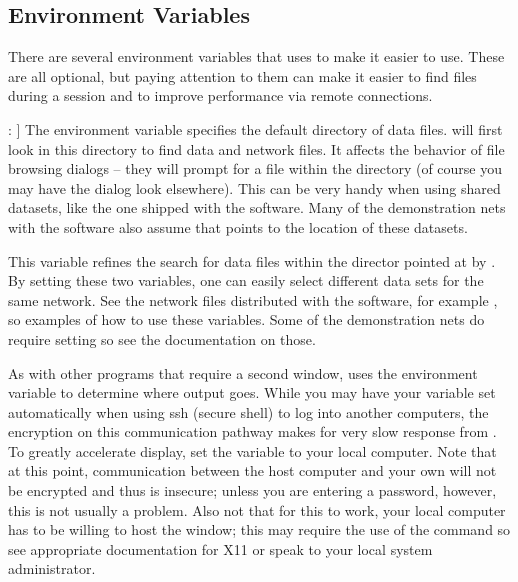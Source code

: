 \subsection{Environment Variables}
\label{sec:environ} 

There are several environment variables that \sr{} uses to make it easier
to use.  These are all optional, but paying attention to them can make it
easier to find files during a \sr{} session and to improve performance via
remote connections.

\begin{description}
  \item{}\mbox{}: ]
        \label{sec:scirundata}
        The environment variable  specifies the
        default directory of \sr{} data files.  \sr will first look in this
        directory to find data and network files.  It affects the behavior
        of file browsing dialogs -- they will prompt for a file within the
         directory (of course you may have the dialog
        look elsewhere).  This can be very handy when using shared
        datasets, like the one shipped with the software.  Many of the
        demonstration nets with the software also assume that
         points to the location of these datasets.

  \item[\envvar{SCIRUN\_DATASET}}\mbox{}: ]\mbox{}
        \label{sec:scirundataset} 
        This variable refines the search for data files within the director
        pointed at by .  By setting these two
        variables, one can easily select different data sets for the same
        network.  See the network files distributed with the software, for
        example , so examples of how to use these
        variables.  Some of the demonstration nets do require setting
         so see the documentation on those.

  \item[\envvar{DISPLAY}: ]\mbox{}
        As with other programs that require a second window, \sr{} uses the
         environment variable to determine where output
        goes.  While you may have your  variable set
        automatically when using ssh (secure shell) to log into another
        computers, the encryption on this communication pathway makes for
        very slow response from \sr{}.  To greatly accelerate display, set
        the  variable to your local computer.  Note that at
        this point, communication between the host computer and your own
        will not be encrypted and thus is insecure; unless you are entering
        a password, however, this is not usually a problem.  Also not that
        for this to work, your local computer has to be willing to host the
        \sr{} window; this may require the use of the 
        command so see appropriate documentation for X11 or speak to your
        local system administrator.
\end{description}



